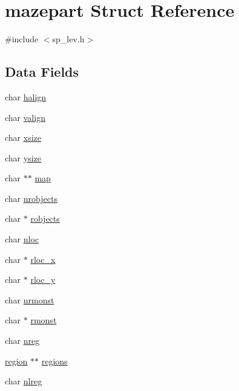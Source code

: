 \hypertarget{structmazepart}{\section{mazepart Struct Reference}
\label{structmazepart}
}


{\ttfamily \#include $<$sp\+\_\+lev.\+h$>$}

\subsection*{Data Fields}
\begin{DoxyCompactItemize}
\item 
char \hyperlink{structmazepart_a4732c03cc9b7ec27a0dafa4c0e7052b8}{halign}
\item 
char \hyperlink{structmazepart_a6a02dfc895ce78e80abd0aeb2fdee848}{valign}
\item 
char \hyperlink{structmazepart_acedba0086dc6b1f652a04429c4a187c3}{xsize}
\item 
char \hyperlink{structmazepart_a67ebc967705c17055149acce62d9dfa7}{ysize}
\item 
char $\ast$$\ast$ \hyperlink{structmazepart_acc1c2da46f6ad2f4aa8c8acf6d0c784e}{map}
\item 
char \hyperlink{structmazepart_a8365c501d22444429933ccf9c24f0d13}{nrobjects}
\item 
char $\ast$ \hyperlink{structmazepart_a1b85e45830a065cd9e8897d3f189d1a0}{robjects}
\item 
char \hyperlink{structmazepart_a6f22df7eb26d70f56e96a62d23e68383}{nloc}
\item 
char $\ast$ \hyperlink{structmazepart_abacd502b4c130c8f1535b3a2e7395a5a}{rloc\+\_\+x}
\item 
char $\ast$ \hyperlink{structmazepart_a9a9a457b7e85fd5de9ed2a7d45ed49a1}{rloc\+\_\+y}
\item 
char \hyperlink{structmazepart_aebd2573a96facc64ca1b59eb12e00812}{nrmonst}
\item 
char $\ast$ \hyperlink{structmazepart_a5eb64241e5204b06d52328993eb37380}{rmonst}
\item 
char \hyperlink{structmazepart_a77f61e8de9fd8dd64f136401902dcf80}{nreg}
\item 
\hyperlink{structregion}{region} $\ast$$\ast$ \hyperlink{structmazepart_a8a9f2792dad915353d99cc6b807fa94a}{regions}
\item 
char \hyperlink{structmazepart_a2599d1a1147830cd8eeb93a7e8e43baa}{nlreg}
\item 

\end{DoxyCompactItemize}
